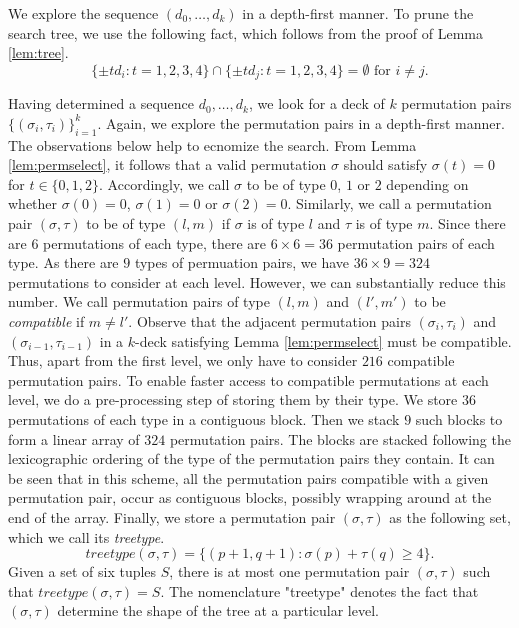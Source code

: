 \documentclass[11pt]{article}
\begin{document}
We explore the sequence $(d_0,\ldots,d_k)$ in a depth-first manner. To
prune the search tree, we use the following fact, which follows from the
proof of Lemma \ref{lem:tree}.
\begin{equation}\label{eq:prune}
\{\pm td_i:t=1,2,3,4\}\cap \{\pm td_j: t=1,2,3,4\} = \emptyset \text{ for }
i\neq j.
\end{equation}

Having determined a sequence $d_0,\ldots,d_k$, we look for a deck of $k$
permutation pairs $\{(\sigma_i,\tau_i)\}_{i=1}^k$. Again, we explore the
permutation pairs in a depth-first manner. The observations below help to
ecnomize the search.
From Lemma \ref{lem:permselect}, it follows that a valid permutation
$\sigma$ should satisfy $\sigma(t)=0$ for $t\in \{0,1,2\}$. Accordingly, we
call $\sigma$ to be of type $0$, $1$ or $2$ depending on whether
$\sigma(0)=0$, $\sigma(1)=0$ or $\sigma(2)=0$. Similarly, we call a
permutation pair $(\sigma,\tau)$ to be of type $(l,m)$ if $\sigma$ is of
type $l$ and $\tau$ is of type $m$. Since there are $6$ permutations of
each type, there are $6\times 6=36$ permutation pairs of each type. As
there are $9$ types of permuation pairs, we have $36\times 9=324$
permutations to consider at each level. However, we can substantially
reduce this number. We call permutation pairs of type
$(l,m)$ and $(l',m')$ to be {\em compatible} if $m\neq l'$. Observe that
the adjacent permutation pairs $(\sigma_i,\tau_i)$ and
$(\sigma_{i-1},\tau_{i-1})$ in a $k$-deck satisfying Lemma
\ref{lem:permselect} must be compatible. Thus, apart from the first level,
we only have to consider $216$ compatible permutation pairs. To enable
faster access to compatible permutations at each level, we do a
pre-processing step of storing them by their type. We store $36$
permutations of each type in a contiguous block. Then we stack $9$ such
blocks to form a linear array of $324$ permutation pairs. The blocks are
stacked following the lexicographic ordering of the type of the permutation
pairs they contain. It can be seen that in this scheme, all the permutation
pairs compatible with a given permutation pair, occur as contiguous blocks,
possibly wrapping around at the end of the array. 
Finally, we store a permutation pair $(\sigma,\tau)$ as the following set,
which we call its {\em treetype}.
\begin{equation}\label{eq:treetype}
treetype(\sigma,\tau) = \{(p+1,q+1): \sigma(p)+\tau(q)\geq 4\}.
\end{equation}
Given a set of six tuples $S$, there is at most one permutation pair
$(\sigma,\tau)$ such that $treetype(\sigma,\tau)=S$. The nomenclature
"treetype" denotes the fact that $(\sigma,\tau)$ determine the shape of
the tree at a particular level. 
\end{document}
